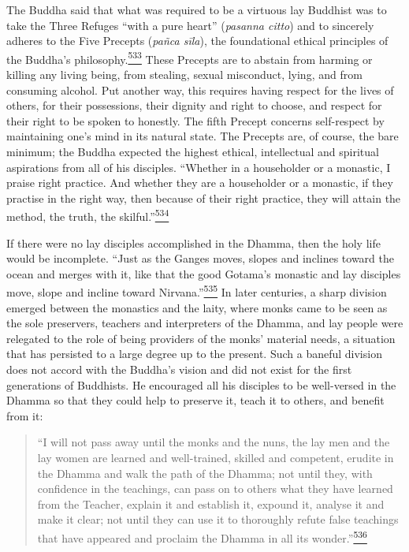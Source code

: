 The Buddha said that what was required to be a virtuous lay Buddhist was
to take the Three Refuges ``with a pure heart'' (\emph{pasanna citto})
and to sincerely adheres to the Five Precepts (\emph{pañca sīla}), the
foundational ethical principles of the Buddha's
philosophy.\label{footprints_split_014.html_fnref533}\hyperref[footprints_split_025.htmlux5cux23fn533]{\textsuperscript{533}}
These Precepts are to abstain from harming or killing any living being,
from stealing, sexual misconduct, lying, and from consuming alcohol. Put
another way, this requires having respect for the lives of others, for
their possessions, their dignity and right to choose, and respect for
their right to be spoken to honestly. The fifth Precept concerns
self-respect by maintaining one's mind in its natural state. The
Precepts are, of course, the bare minimum; the Buddha expected the
highest ethical, intellectual and spiritual aspirations from all of his
disciples. ``Whether in a householder or a monastic, I praise right
practice. And whether they are a householder or a monastic, if they
practise in the right way, then because of their right practice, they
will attain the method, the truth, the
skilful.''\label{footprints_split_014.html_fnref534}\hyperref[footprints_split_025.htmlux5cux23fn534]{\textsuperscript{534}}

If there were no lay disciples accomplished in the Dhamma, then the holy
life would be incomplete. ``Just as the Ganges moves, slopes and
inclines toward the ocean and merges with it, like that the good
Gotama's monastic and lay disciples move, slope and incline toward
Nirvana.''\label{footprints_split_014.html_fnref535}\hyperref[footprints_split_025.htmlux5cux23fn535]{\textsuperscript{535}}
In later centuries, a sharp division emerged between the monastics and
the laity, where monks came to be seen as the sole preservers, teachers
and interpreters of the Dhamma, and lay people were relegated to the
role of being providers of the monks' material needs, a situation that
has persisted to a large degree up to the present. Such a baneful
division does not accord with the Buddha's vision and did not exist for
the first generations of Buddhists. He encouraged all his disciples to
be well-versed in the Dhamma so that they could help to preserve it,
teach it to others, and benefit from it:

\begin{quote}
``I will not pass away until the monks and the nuns, the lay men and the
lay women are learned and well-trained, skilled and competent, erudite
in the Dhamma and walk the path of the Dhamma; not until they, with
confidence in the teachings, can pass on to others what they have
learned from the Teacher, explain it and establish it, expound it,
analyse it and make it clear; not until they can use it to thoroughly
refute false teachings that have appeared and proclaim the Dhamma in all
its
wonder.''\label{footprints_split_014.html_fnref536}\hyperref[footprints_split_025.htmlux5cux23fn536]{\textsuperscript{536}}
\end{quote}

